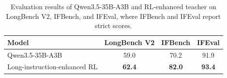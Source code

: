 \begin{table}[t]
\footnotesize
\centering
\setlength{\tabcolsep}{4pt}
\renewcommand{\arraystretch}{1.3}
\caption{Evaluation results of Qwen3.5-35B-A3B and RL-enhanced teacher on LongBench V2, IFBench, and IFEval, where IFBench and IFEval report strict scores.}
\begin{tabular}{lccc}
\toprule
\textbf{Model}
& \textbf{LongBench V2}
& \textbf{IFBench}
& \textbf{IFEval} \\
\midrule

Qwen3.5-35B-A3B
& 59.0
& 70.2
& 91.9 \\

Long-instruction-enhanced RL
& \textbf{62.4}
& \textbf{82.0}
& \textbf{93.4} \\
\bottomrule
\end{tabular}
\label{tab:long_sft_rl_results}
\end{table}